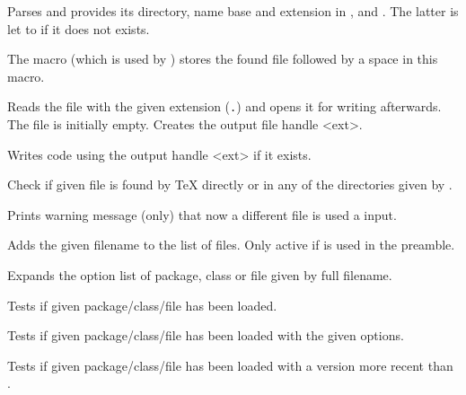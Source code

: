 \documentclass[12pt,a4paper]{article}
\begin{document}
\DescribeMacro{}
\noindent
Parses  and provides its directory, name base and extension in \Macro\filename@area,
\Macro\filename@base and \Macro\filename@ext. The latter is let to \Macro\relax if it does not
exists.

\DescribeMacro\@filef@und
The macro \Macro\IfFileExists (which is used by \Macro\InputIfFileExists) stores the found file followed by a space in this macro.

\DescribeMacro{}
\noindent
Reads the file with the given extension (\texttt{\string\jobname.}) and opens it for
writing afterwards. The file is initially empty. Creates the output file handle \Macro\tf@<ext>.

\DescribeMacro{}
\noindent
Writes code using the output handle \Macro\tf@<ext> if it exists.


\DescribeMacro{}
\noindent
Check if given file is found by \TeX{} directly or in any of the directories given by . 

\DescribeMacro{}
\noindent
Prints warning message (only) that now a different file is used a input.

\DescribeMacro{}
\noindent
Adds the given filename to the list of files. Only active if  is used in the preamble. 

\DescribeMacro{}
\noindent
Expands the option list of package, class or file given by full filename. 

\DescribeMacro{}
\DescribeMacro{}
\DescribeMacro{}
Tests if given package/class/file has been loaded.


\DescribeMacros
\Macro{}
\Macro{}
\Macro{}
\endDescribeMacros
\noindent
Tests if given package/class/file has been loaded with the given options.

\DescribeMacros
\Macro{}
\Macro{}
\Macro{}
\endDescribeMacros
\noindent
Tests if given package/class/file has been loaded with a version more recent than .
\end{document}

